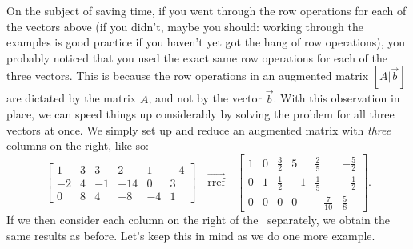 On the subject of saving time, if you went through the row operations for each of the vectors above (if you didn't, maybe you should: working through the examples is good practice if you haven't yet got the hang of row operations), you probably noticed that you used the exact same row operations for each of the three vectors. This is because the row operations in an augmented matrix $[A|\vec{b}]$ are dictated by the matrix $A$, and not by the vector $\vec{b}$. With this observation in place, we can speed things up considerably by solving the problem for all three vectors at once. We simply set up and reduce an augmented matrix with \textit{three} columns on the right, like so:
\[
\left[\begin{array}{ccc|c|c|c}1&3&3&2&1&-4\\ -2&4&-1&-14&0&3\\0&8&4&-8&-4&1 \end{array}\right] \quad \overrightarrow{\text{rref}}\quad \left[\begin{array}{ccc|c|c|c} 1&0&\frac32&5&\frac25 &-\frac52 \\0&1&\frac12&-1&\frac15 &-\frac 12\\0&0&0&0&-\frac{7}{10}&\frac58 \end{array}\right].
\]
If we then consider each column on the right of the \rref\ separately, we obtain the same results as before. Let's keep this in mind as we do one more example.

\medskip


